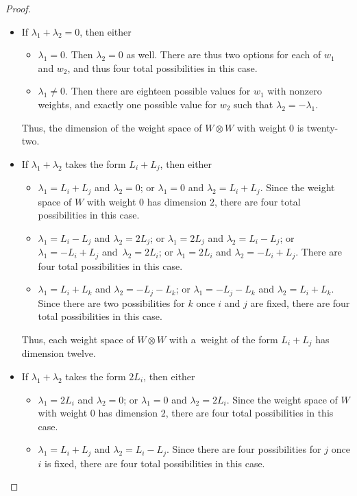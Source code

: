 \documentclass[pdftex]{sigma}
\numberwithin{equation}{section}
\theoremstyle{definition}
\begin{document}
\begin{proof}
 \begin{itemize}\itemsep=0pt
 \item If $\lambda_1+\lambda_2 = 0$, then either
 \begin{itemize}\itemsep=0pt
\item[$*$] $\lambda_1 = 0$. Then $\lambda_2 = 0$ as well. There are thus two options for each of $w_1$ and $w_2$, and thus four total possibilities in this case.
\item[$*$] $\lambda_1 \ne 0$. Then there are eighteen possible values for $w_1$ with nonzero weights, and exactly one possible value for $w_2$ such that $\lambda_2 = -\lambda_1$.
 \end{itemize}
 Thus, the dimension of the weight space of $W \otimes W$ with weight $0$ is twenty-two.
 \item If $\lambda_1+\lambda_2$ takes the form $L_i+L_j$, then either
 \begin{itemize}\itemsep=0pt
\item[$*$] $\lambda_1 = L_i + L_j$ and $\lambda_2 = 0$; or $\lambda_1 = 0$ and $\lambda_2 = L_i + L_j$. Since the weight space of $W$ with weight $0$ has dimension $2$, there are four total possibilities in this case.
\item[$*$] $\lambda_1 = L_i - L_j$ and $\lambda_2 = 2L_j$; or $\lambda_1 = 2L_j$ and $\lambda_2 = L_i - L_j$; or $\lambda_1 = -L_i + L_j$ and~${\lambda_2 = 2L_i}$; or $\lambda_1 = 2L_i$ and $\lambda_2 = -L_i + L_j$. There are four total possibilities in this case.
\item[$*$] $\lambda_1 = L_i + L_k$ and $\lambda_2 = -L_j - L_k$; or $\lambda_1 = -L_j - L_k$ and $\lambda_2 = L_i + L_k$. Since there are two possibilities for $k$ once $i$ and $j$ are fixed, there are four total possibilities in this case.
 \end{itemize}
 Thus, each weight space of $W \otimes W$ with a~weight of the form $L_i + L_j$ has dimension twelve.
 \item If $\lambda_1 + \lambda_2$ takes the form $2L_i$, then either
 \begin{itemize}\itemsep=0pt
\item[$*$] $\lambda_1 = 2L_i$ and $\lambda_2 = 0$; or $\lambda_1 = 0$ and $\lambda_2 = 2L_i$. Since the weight space of $W$ with weight $0$ has dimension $2$, there are four total possibilities in this case.
\item[$*$] $\lambda_1 = L_i + L_j$ and $\lambda_2 = L_i - L_j$. Since there are four possibilities for $j$ once $i$ is fixed, there are four total possibilities in this case.

\end{itemize}
\end{itemize}
\end{proof}
\end{document}
